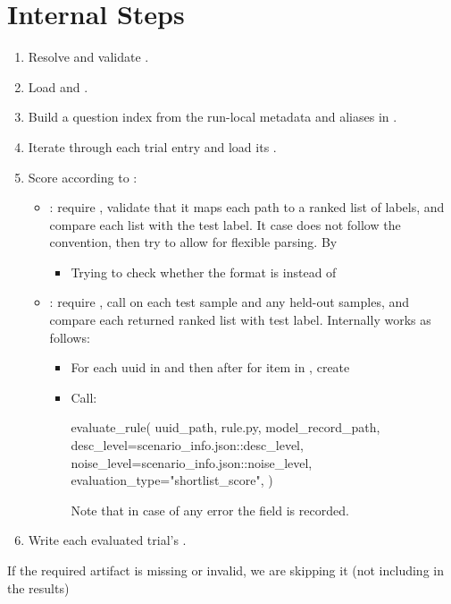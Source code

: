 \documentclass[11pt]{article}
\begin{document}
\section*{Internal Steps}
\begin{enumerate}
  \item Resolve and validate .
  \item Load  and .
  \item Build a question index from the run-local metadata and aliases in .
  \item Iterate through each trial entry and load its .
  \item Score according to :
  \begin{itemize}
    \item {}: require , validate that it maps each  path to a ranked list of labels, and compare each list with the test label.
    It case  does not follow the convention, then try to allow for flexible parsing. By
    \begin{itemize}
      \item Trying to check whether the format is  instead of 
    \end{itemize}
    \item {}: require , call  on each test sample and any held-out  samples, and compare each returned ranked list with test label.
    Internally  works as follows:
    \begin{itemize}
      \item For each uuid in  and then after for item in , create 
      \item Call:
      \begin{DocCode}
evaluate_rule(
    uuid_path,
    rule.py,
    model_record_path,
    desc_level=scenario_info.json::desc_level,
    noise_level=scenario_info.json::noise_level,
    evaluation_type="shortlist_score",
)
      \end{DocCode}
      Note that in case of any error the  field is recorded.
    \end{itemize}
  \end{itemize}
  \item Write each evaluated trial's .
\end{enumerate}
If the required artifact is missing or invalid, we are skipping it (not including in the results)
\end{document}
